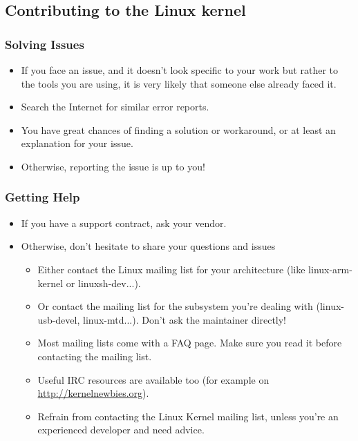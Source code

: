 \subsection{Contributing to the Linux kernel}

\begin{frame}
  \frametitle{Solving Issues}
  \begin{itemize}
  \item If you face an issue, and it doesn't look specific to your
    work but rather to the tools you are using, it is very likely that
    someone else already faced it.
  \item Search the Internet for similar error reports.
  \item You have great chances of finding a solution or workaround, or
    at least an explanation for your issue.
  \item Otherwise, reporting the issue is up to you!
  \end{itemize}
\end{frame}

\begin{frame}
  \frametitle{Getting Help}
  \begin{itemize}
  \item If you have a support contract, ask your vendor.
  \item Otherwise, don't hesitate to share your questions and issues
    \begin{itemize}
    \item Either contact the Linux mailing list for your architecture
      (like linux-arm-kernel or linuxsh-dev...).
    \item Or contact the mailing list for the subsystem you're dealing
      with (linux-usb-devel, linux-mtd...). Don't ask the maintainer
      directly!
    \item Most mailing lists come with a FAQ page. Make sure you read
      it before contacting the mailing list.
    \item Useful IRC resources are available too
      (for example on \url{http://kernelnewbies.org}).
    \item Refrain from contacting the Linux Kernel mailing list,
      unless you're an experienced developer and need advice.
    \end{itemize}
  \end{itemize}
\end{frame}

